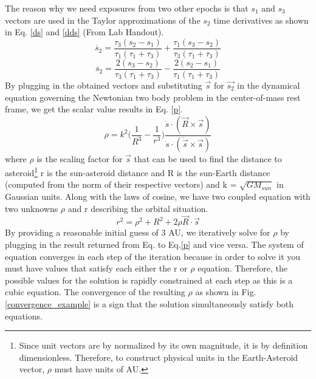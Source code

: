 \documentclass[authoryear, 12pt,5p, times]{elsarticle}
\begin{document}
    The reason why we need exposures from two other epochs is that  $s_1$ and $s_3$ vectors are used in the Taylor approximations of the $s_2$ time derivatives as shown in Eq. \ref{ds} and \ref{dds} (From Lab Handout).
    \begin{equation}
    \dot{s_2} =\frac{\tau_3(s_2-s_1)}{\tau_1 (\tau_1+\tau_3)}+\frac{\tau_1(s_3-s_2)}{\tau_3(\tau_1+\tau_3)}
    \label{ds}
    \end{equation}
    \begin{equation}
      \ddot{s_2} =\frac{2(s_3-s_2)}{\tau_3 (\tau_1+\tau_3)}-\frac{2(s_2-s_1)}{\tau_1(\tau_1+\tau_3)}
    \label{dds}
    \end{equation} 
    By plugging in the obtained vectors and substituting $\vec{s}$ for $\vec{s_2}$ in the dynamical equation governing the Newtonian two body problem in the center-of-mass rest frame, we get the scalar value results in Eq. \ref{p}.
    \begin{equation}
    \rho = k^2\Bigg(\frac{1}{R^3}-\frac{1}{r^3}\Bigg)\frac{\dot{s}\cdot(\vec{R}\times \vec{s})}{\dot{s}\cdot(\ddot{\vec{s}}\times\vec{s})}
    \label{p}
    \end{equation}
    where $\rho$ is the scaling factor for $\vec{s}$ that can be used to find the distance to asteroid\footnote{Since unit vectors are by normalized by its own magnitude, it is by definition dimensionless. Therefore, to construct physical units in the Earth-Asteroid vector, $\rho$ must have units of AU.}
    r is the sun-asteroid distance and R is the sun-Earth distance (computed from the norm of their respective vectors) and k = $\sqrt{GM_{sun}}$ in Gaussian units.
    Along with the laws of cosine,  we have two coupled equation with two unknowns  $\rho$ and r describing the orbital situation.
    \begin{equation}
    r^2 = \rho^2+R^2+2\rho \vec{R}\cdot\vec{s}
    \label{r}
    \end{equation}
     By providing a reasonable initial guess of 3 AU, we iteratively solve for $\rho$ by plugging in the result returned from Eq.\label{r} to Eq.\ref{p} and vice versa. The system of equation converges in each step of the iteration because in order to solve it you must have values that satisfy each either the r or $\rho$ equation. Therefore, the possible values for the solution is rapidly constrained at each step as this is a cubic equation. The convergence of the resulting $\rho$ as shown in Fig.\ref{convergence_example} is a sign that the solution simultaneously satisfy both equations. 
    \label{iterative_soln}
\end{document}
